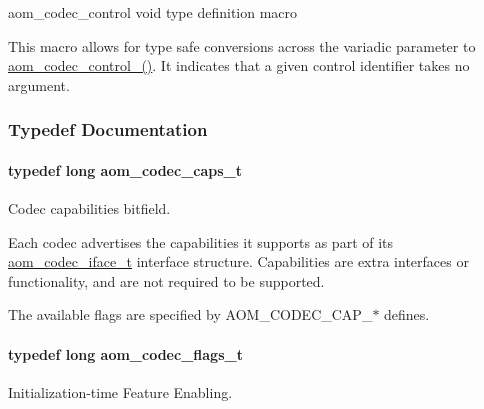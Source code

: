 aom\+\_\+codec\+\_\+control void type definition macro 

This macro allows for type safe conversions across the variadic parameter to \hyperlink{group__codec_ga51eb332a40dcacc39000ab8e0be36b79}{aom\+\_\+codec\+\_\+control\+\_\+()}. It indicates that a given control identifier takes no argument. 

\subsubsection{Typedef Documentation}
\paragraph[{\texorpdfstring{aom\+\_\+codec\+\_\+caps\+\_\+t}{aom_codec_caps_t}}]{\setlength{\rightskip}{0pt plus 5cm}typedef long {\bf aom\+\_\+codec\+\_\+caps\+\_\+t}}\hypertarget{group__codec_ga019a4c05cd929e7c50133f6b536eeabf}{}\label{group__codec_ga019a4c05cd929e7c50133f6b536eeabf}


Codec capabilities bitfield. 

Each codec advertises the capabilities it supports as part of its \hyperlink{group__codec_ga4ef55b44c762836d1550e11921bed403}{aom\+\_\+codec\+\_\+iface\+\_\+t} interface structure. Capabilities are extra interfaces or functionality, and are not required to be supported.

The available flags are specified by A\+O\+M\+\_\+\+C\+O\+D\+E\+C\+\_\+\+C\+A\+P\+\_\+$\ast$ defines. 
\paragraph[{\texorpdfstring{aom\+\_\+codec\+\_\+flags\+\_\+t}{aom_codec_flags_t}}]{\setlength{\rightskip}{0pt plus 5cm}typedef long {\bf aom\+\_\+codec\+\_\+flags\+\_\+t}}\hypertarget{group__codec_ga18f2242c1afca329581fbd3f2c81721b}{}\label{group__codec_ga18f2242c1afca329581fbd3f2c81721b}


Initialization-\/time Feature Enabling. 


